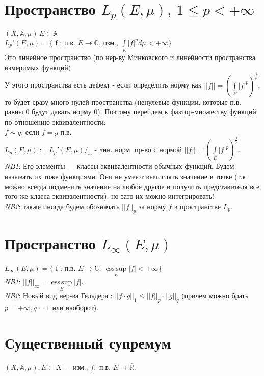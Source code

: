 \documentclass[paper=a4, fontsize=17pt]{article}
\DeclareMathOperator*{\esssup}{ess\, sup}
\begin{document}
	\section{Пространство $L_p(E,\mu),\ 1 \leq p < +\infty$}
	$(X, \mathds{A}, \mu)\, E \in \mathds{A}$\\
	$L_p'(E, \mu) = \{$ f : п.в. $E \rightarrow \mathbb{C}$, изм., $ \int\limits_E |f|^p d\mu < +\infty \}$\\
	Это линейное пространство (по нер-ву Минковского и линейности пространства измеримых функций).\\
	У этого пространства есть дефект - если определить норму как $||f|| = \left(\int\limits_E |f|^p\right)^\frac{1}{p}$, то будет сразу много нулей пространства (ненулевые функции, которые п.в. равны 0 будут давать норму 0).
	Поэтому перейдем к фактор-множеству функций по отношению эквивалентности:\\
	$f \sim g$, если $f = g$ п.в.\\
	$ L_p(E, \mu) := L_p'(E, \mu) /_{\sim}$ - лин. норм. пр-во с нормой $||f|| = \left(\int\limits_E |f|^p\right)^\frac{1}{p}$.\\
	
	\emph{NB1}: Его элементы --- классы эквивалентности обычных функций. Будем называть их тоже функциями. Они не умеют вычислять значение в точке (т.к. можно всегда подменить значение на любое другое и получить представителя все того же класса эквивалентности), но зато их можно интегрировать!\\
	
	\emph{NB2}: также иногда будем обозначать $||f||_p$ за норму $f$ в пространстве $L_p$.
	
	\section{Пространство $L_{\infty}(E,\mu)$}
	$L_\infty(E, \mu) =\{$ f : п.в. $E \rightarrow \mathbb{C},\ \esssup\limits_E |f| < +\infty \}$\\
	\emph{NB1}: $||f||_\infty = \esssup\limits_E |f|$.\\
	
	\emph{NB2}: Новый вид нер-ва Гельдера : $||f \cdot g||_1 \leq ||f||_p \cdot ||g||_q$ (причем можно брать $p = +\infty, q = 1$ или наоборот).
	
	\section{Существенный супремум}
	$(X, \mathds{A}, \mu), E \subset X - $ изм., $f : $ п.в. $E \rightarrow \overline{\mathbb{R}}$.\\
	
\end{document}
